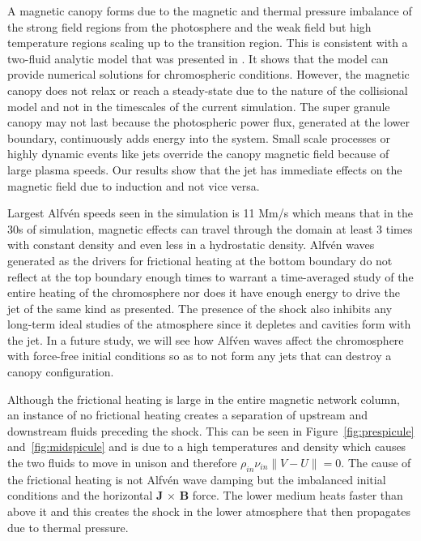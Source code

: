 \documentclass[12pt,upcase]{umlthesis}
\begin{document}
A magnetic canopy forms due to the magnetic and thermal pressure imbalance of the strong field regions from the photosphere and the weak field but high temperature regions scaling up to the transition region. This is consistent with a two-fluid analytic model that was presented in \citet{Song2017}. It shows that the model can provide numerical solutions for chromospheric conditions. However, the magnetic canopy does not relax or reach a steady-state due to the nature of the collisional model and not in the timescales of the current simulation. The super granule canopy may not last because the photospheric power flux, generated at the lower boundary, continuously adds energy into the system. Small scale processes or highly dynamic events like jets override the canopy magnetic field because of large plasma speeds. Our results show that the jet has immediate effects on the magnetic field due to induction and not vice versa.

Largest Alfv\'en speeds seen in the simulation is 11 Mm/s which means that in the 30s of simulation, magnetic effects can travel through the domain at least 3 times with constant density and even less in a hydrostatic density. Alfv\'en waves generated as the drivers for frictional heating at the bottom boundary do not reflect at the top boundary enough times to warrant a time-averaged study of the entire heating of the chromosphere nor does it have enough energy to drive the jet of the same kind as presented. The presence of the shock also inhibits any long-term ideal studies of the atmosphere since it depletes and cavities form with the jet. In a future study, we will see how Alf\'ven waves affect the chromosphere with force-free initial conditions so as to not form any jets that can destroy a canopy configuration.

Although the frictional heating is large in the entire magnetic network column, an instance of no frictional heating creates a separation of upstream and downstream fluids preceding the shock. This can be seen in Figure~\ref{fig:prespicule} and~\ref{fig:midspicule} and is due to a high temperatures and density which causes the two fluids to move in unison and therefore $\rho_{in} \nu_{in} \|V-U\| = 0$. The cause of the frictional heating is not Alfv\'en wave damping but the imbalanced initial conditions and the horizontal \textbf{J} $\times$ \textbf{B} force. The lower medium heats faster than above it and this creates the shock in the lower atmosphere that then propagates due to thermal pressure.
\end{document}
